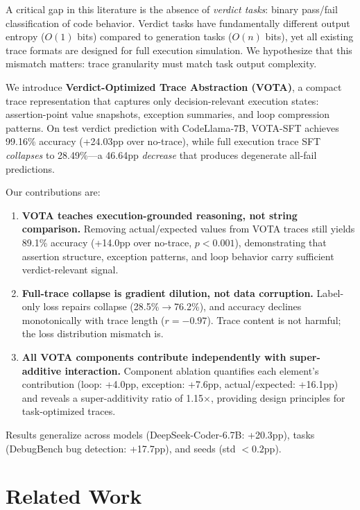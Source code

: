 \documentclass[11pt,a4paper]{article}
\begin{document}
A critical gap in this literature is the absence of \emph{verdict tasks}: binary pass/fail classification of code behavior. Verdict tasks have fundamentally different output entropy ($O(1)$ bits) compared to generation tasks ($O(n)$ bits), yet all existing trace formats are designed for full execution simulation. We hypothesize that this mismatch matters: trace granularity must match task output complexity.

We introduce \textbf{Verdict-Optimized Trace Abstraction (VOTA)}, a compact trace representation that captures only decision-relevant execution states: assertion-point value snapshots, exception summaries, and loop compression patterns. On test verdict prediction with CodeLlama-7B, VOTA-SFT achieves 99.16\% accuracy (+24.03pp over no-trace), while full execution trace SFT \emph{collapses} to 28.49\%---a 46.64pp \emph{decrease} that produces degenerate all-fail predictions.

Our contributions are:
\begin{enumerate}
\item \textbf{VOTA teaches execution-grounded reasoning, not string comparison.} Removing actual/expected values from VOTA traces still yields 89.1\% accuracy (+14.0pp over no-trace, $p < 0.001$), demonstrating that assertion structure, exception patterns, and loop behavior carry sufficient verdict-relevant signal.
\item \textbf{Full-trace collapse is gradient dilution, not data corruption.} Label-only loss repairs collapse (28.5\%$\to$76.2\%), and accuracy declines monotonically with trace length ($r = -0.97$). Trace content is not harmful; the loss distribution mismatch is.
\item \textbf{All VOTA components contribute independently with super-additive interaction.} Component ablation quantifies each element's contribution (loop: +4.0pp, exception: +7.6pp, actual/expected: +16.1pp) and reveals a super-additivity ratio of 1.15$\times$, providing design principles for task-optimized traces.
\end{enumerate}

Results generalize across models (DeepSeek-Coder-6.7B: +20.3pp), tasks (DebugBench bug detection: +17.7pp), and seeds (std $< 0.2$pp).

\section{Related Work}
\end{document}
